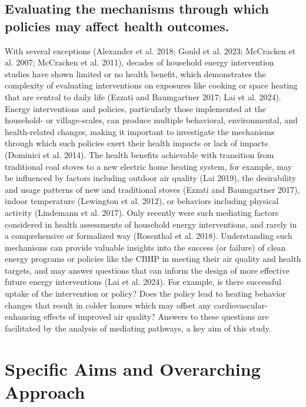 \documentclass[
  letterpaper,
  DIV=11,
  numbers=noendperiod]{scrartcl}
\begin{document}
\subsection{Evaluating the mechanisms through which policies may affect
health
outcomes.}\label{evaluating-the-mechanisms-through-which-policies-may-affect-health-outcomes.}

With several exceptions (Alexander et al. 2018; Gould et al. 2023;
McCracken et al. 2007; McCracken et al. 2011), decades of household
energy intervention studies have shown limited or no health benefit,
which demonstrates the complexity of evaluating interventions on
exposures like cooking or space heating that are central to daily life
(Ezzati and Baumgartner 2017; Lai et al. 2024). Energy interventions and
policies, particularly those implemented at the household- or
village-scales, can produce multiple behavioral, environmental, and
health-related changes, making it important to investigate the
mechanisms through which such policies exert their health impacts or
lack of impacts (Dominici et al. 2014). The health benefits achievable
with transition from traditional coal stoves to a new electric home
heating system, for example, may be influenced by factors including
outdoor air quality (Lai 2019), the desirability and usage patterns of
new and traditional stoves (Ezzati and Baumgartner 2017), indoor
temperature (Lewington et al. 2012), or behaviors including physical
activity (Lindemann et al. 2017). Only recently were such mediating
factors considered in health assessments of household energy
interventions, and rarely in a comprehensive or formalized way
(Rosenthal et al. 2018). Understanding such mechanisms can provide
valuable insights into the success (or failure) of clean energy programs
or policies like the CBHP in meeting their air quality and health
targets, and may answer questions that can inform the design of more
effective future energy interventions (Lai et al. 2024). For example, is
there successful uptake of the intervention or policy? Does the policy
lead to heating behavior changes that result in colder homes which may
offset any cardiovascular-enhancing effects of improved air quality?
Answers to these questions are facilitated by the analysis of mediating
pathways, a key aim of this study.

\section{Specific Aims and Overarching
Approach}\label{specific-aims-and-overarching-approach}
\end{document}
